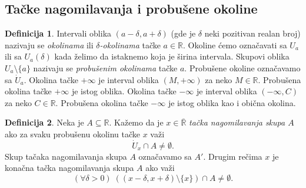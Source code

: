 \documentclass[a4paper,12pt]{article}
\theoremstyle{plain}
\theoremstyle{definition}
\newtheorem{definition}{Definicija}[section]
\theoremstyle{remark}
\begin{document}
\subsection{Tačke nagomilavanja i probušene okoline}
\begin{definition}
    Intervali oblika $(a - \delta, a + \delta)$ (gde je $\delta$ neki pozitivan realan broj) nazivaju se \textit{okolinama} ili \textit{$\delta$-okolinama} tačke $a \in \mathbb{R}$. Okoline ćemo označavati sa $U_a$ ili sa $U_a(\delta)$ kada želimo da istaknemo koja je širina intervala. Skupovi oblika $U_a \setminus \{a\}$ nazivaju se \textit{probušenim okolinama} tačke $a$. Probušene okoline označavamo sa $\dot{U}_a$. Okolina tačke $+\infty$ je interval oblika $(M, +\infty)$ za neko $M \in \mathbb{R}$. Probušena okolina tačke $+\infty$ je istog oblika. Okolina tačke $-\infty$ je interval oblika $(-\infty, C)$ za neko $C \in \mathbb{R}$. Probušena okolina tačke $-\infty$ je istog oblika kao i obična okolina.
\end{definition}
\begin{definition}
    Neka je $A \subseteq \mathbb{R}$. Kažemo da je $x \in \overline{\mathbb{R}}$ \textit{tačka nagomilavanja skupa $A$} ako za svaku probušenu okolinu tačke $x$ važi
    \[ \dot{U}_x \cap A \neq \emptyset. \]
    Skup tačaka nagomilavanja skupa $A$ označavamo sa $A'$.
    Drugim rečima $x$ je konačna tačka nagomilavanja skupa $A$ ako važi
\[ (\forall \delta > 0) \; ((x - \delta, x + \delta) \setminus \{x\}) \cap A \neq \emptyset. \]
\end{definition}
\end{document}
